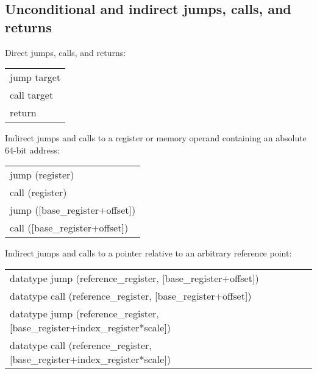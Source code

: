 \documentclass[forwardcom.tex]{subfiles}
\begin{document}
\subsection{Unconditional and indirect jumps, calls, and returns} \label{assemblyJumps}
Direct jumps, calls, and  returns:
\vspace{2mm}

\begin{tabular}{|p{140mm}|}
\hline
\hspace{4mm} jump target\\
\hspace{4mm} call target\\
\hspace{4mm} return\\
\hline
\end{tabular}
\vspace{4mm}

Indirect jumps and calls to a register or memory operand containing an absolute 64-bit address:

\begin{tabular}{|p{140mm}|}
\hline
\hspace{4mm} jump (register)\\
\hspace{4mm} call (register)\\
\hspace{4mm} jump ([base\_register+offset])\\
\hspace{4mm} call ([base\_register+offset])\\
\hline
\end{tabular}
\vspace{4mm}

Indirect jumps and calls to a pointer relative to an arbitrary reference point:

\begin{tabular}{|p{140mm}|}
\hline
\hspace{4mm} datatype jump (reference\_register, [base\_register+offset])\\
\hspace{4mm} datatype call (reference\_register, [base\_register+offset])\\
\hspace{4mm} datatype jump (reference\_register, [base\_register+index\_register*scale])\\
\hspace{4mm} datatype call (reference\_register, [base\_register+index\_register*scale])\\
\hline
\end{tabular}
\vspace{4mm}
\end{document}
